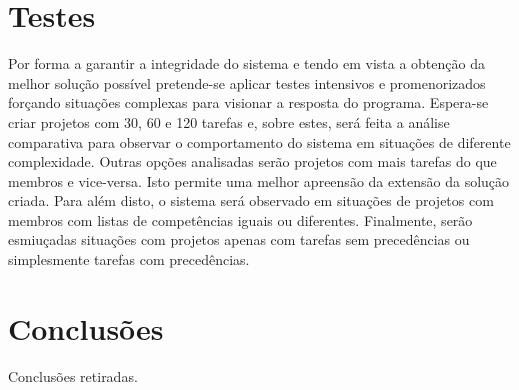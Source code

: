 \begin{titlepage}
\section{Testes}
\justify\normalsize
Por forma a garantir a integridade do sistema e tendo em vista a obtenção da melhor solução possível pretende-se aplicar testes intensivos e promenorizados forçando situações complexas para visionar a resposta do programa. Espera-se criar projetos com 30, 60 e 120 tarefas e, sobre estes, será feita a análise comparativa para observar o comportamento do sistema em situações de diferente complexidade. Outras opções analisadas serão projetos com mais tarefas do que membros e vice-versa. Isto permite uma melhor apreensão da extensão da solução criada. Para além disto, o sistema será observado em situações de projetos com membros com listas de competências iguais ou diferentes. Finalmente, serão esmiuçadas situações com projetos apenas com tarefas sem precedências ou simplesmente tarefas com precedências.

\section{Conclusões}
\justify\normalsize
Conclusões retiradas.

\printindex

\end{titlepage}

